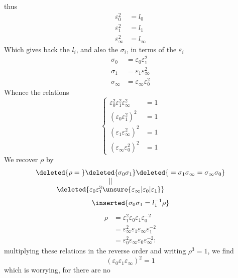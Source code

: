 thus
\[
\begin{aligned}
\varepsilon_0^2&=l_0\\
\varepsilon_1^2&=l_1\\
\varepsilon_\infty^2&=l_\infty
\end{aligned}
\]
Which gives back the $l_i$, and also the $\sigma_i$,  in terms of the $\varepsilon_i$
\[
\begin{aligned}
\sigma_0&=\varepsilon_0\varepsilon_1^2\\
\sigma_1&=\varepsilon_1\varepsilon_\infty^2\\
\sigma_\infty&=\varepsilon_\infty\varepsilon_0^2
\end{aligned}
\]
Whence the relations
\[
\left\{\begin{aligned}
\varepsilon_0^2\varepsilon_1^2\varepsilon_\infty^2&=1\\
(\varepsilon_0\varepsilon_1^2)^2&=1\\
(\varepsilon_1\varepsilon_\infty^2)^2&=1\\
(\varepsilon_\infty\varepsilon_0^2)^2&=1
\end{aligned}\right.
\]
We recover $\rho$  by
\[
\begin{array}{r@{}c@{}l}
\deleted{\rho={}}&\deleted{\sigma_0\sigma_1}&\deleted{{}=\sigma_1\sigma_\infty=\sigma_\infty\sigma_0}\\
&\Vert&\\
&\makebox[0pt][c]{$\deleted{\varepsilon_0\varepsilon_1^3\unsure{\varepsilon_\infty|\varepsilon_0|\varepsilon_1}}$}&
\end{array}
\]
\[
\inserted{\sigma_0\sigma_1=l_1^{-1}\rho}
\]
\[
\begin{aligned}
\rho&=\varepsilon_1^2\varepsilon_0\varepsilon_1\varepsilon_0^{-2}\\
&=\varepsilon_\infty^2\varepsilon_1\varepsilon_\infty\varepsilon_1^{-2}\\
&=\varepsilon_0^2\varepsilon_\infty\varepsilon_0\varepsilon_\infty^{-2}:
\end{aligned}
\]
multiplying  these relations in the reverse order and writing $\rho^3=1$, we find
\[
(\varepsilon_0\varepsilon_1\varepsilon_\infty)^2=1
\]
which is worrying, for there are no 
